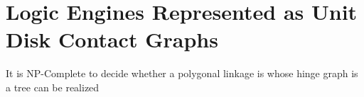 
\section{Logic Engines Represented as Unit Disk Contact Graphs}

\begin{thm}
 It is NP-Complete to decide whether a polygonal linkage is whose hinge graph is a tree can be 
realized
\end{thm}

